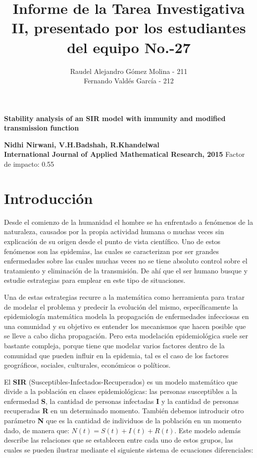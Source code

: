 \documentclass{article}
\title{Informe de la Tarea Investigativa II, presentado por los estudiantes del equipo No.-27}
\author{Raudel Alejandro G\'omez Molina - 211 \\ Fernando Vald\'es Garc\'ia - 212}
\date{}
\begin{document}
    \maketitle

    \begin{center}
        
        \LARGE{\textbf{Stability analysis of an SIR model with immunity and modified transmission function}} \par \bigskip
        \normalsize
        \Large{\textbf{Nidhi Nirwani, V.H.Badshah, R.Khandelwal}}  \\ \bigskip
        \textbf{International Journal of Applied Mathematical Research, 2015}
        Factor de impacto: 0.55 
    \end{center}

    \pagebreak

    \section{Introducción}
    
    Desde el comienzo de la humanidad el hombre se ha enfrentado a fenómenos de la naturaleza, causados por la propia actividad humana o muchas veces sin explicación de su origen desde el punto de vista científico. Uno de estos fenómenos son las epidemias, las cuales se caracterizan por ser grandes enfermedades sobre las cuales muchas veces no se tiene absoluto control sobre el tratamiento y eliminación de la transmisión. De ahí que el ser humano busque y estudie estrategias para emplear en este tipo de situaciones.
    
    Una de estas estrategias recurre a la matemática como herramienta para tratar de modelar el problema y predecir la evolución del mismo, específicamente la epidemiología matemática modela la propagación de enfermedades infecciosas en una comunidad y su objetivo es entender los mecanismos que hacen posible que se lleve a cabo dicha propagación. Pero esta modelación epidemiológica suele ser bastante compleja, porque tiene que modelar varios factores dentro de la comunidad que pueden influir en la epidemia, tal es el caso de los factores geográficos, sociales, culturales, económicos o políticos.
    
    El \textbf{SIR} (Susceptibles-Infectados-Recuperados) es un modelo matemático que divide a la población en clases epidemiológicas: las personas susceptibles a la enfermedad \textbf{S}, la cantidad de personas infectadas \textbf{I} y la cantidad de personas recuperadas \textbf{R} en un determinado momento. También debemos introducir otro parámetro \textbf{N} que es la cantidad de individuos de la población en un momento dado, de manera que: $N(t)=S(t)+I(t)+R(t)$. Este modelo además describe las relaciones que se establecen entre cada uno de estos grupos, las cuales se pueden ilustrar mediante el siguiente sistema de ecuaciones diferenciales:
       
\end{document}
